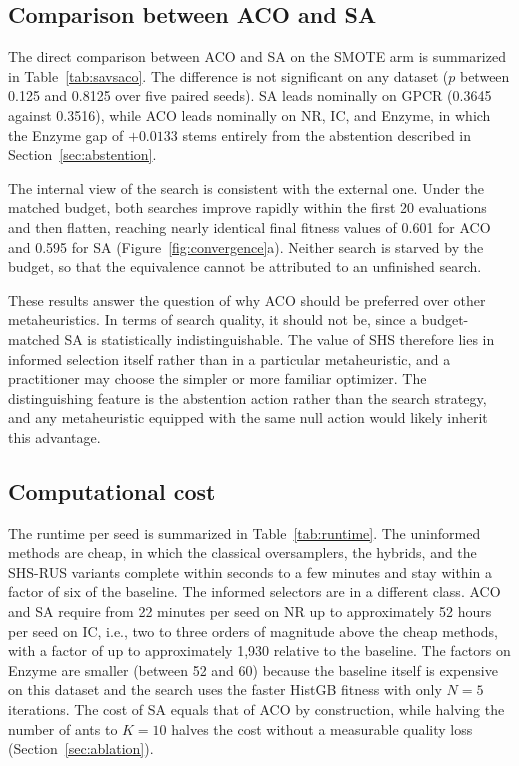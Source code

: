 \documentclass[10pt,a4paper]{article}
\begin{document}
\subsection{Comparison between ACO and SA}
The direct comparison between ACO and SA on the SMOTE arm is summarized
in Table~\ref{tab:savsaco}. The difference is not significant on any
dataset ($p$ between 0.125 and 0.8125 over five paired seeds). SA leads
nominally on GPCR (0.3645 against 0.3516), while ACO leads nominally on
NR, IC, and Enzyme, in which the Enzyme gap of $+0.0133$ stems entirely
from the abstention described in Section~\ref{sec:abstention}.

The internal view of the search is consistent with the external one.
Under the matched budget, both searches improve rapidly within the first
20 evaluations and then flatten, reaching nearly identical final fitness
values of 0.601 for ACO and 0.595 for SA
(Figure~\ref{fig:convergence}a). Neither search is starved by the
budget, so that the equivalence cannot be attributed to an unfinished
search.

These results answer the question of why ACO should be preferred over
other metaheuristics. In terms of search quality, it should not be,
since a budget-matched SA \citep{kirkpatrick1983optimization,
chennuru2022simulated} is statistically indistinguishable. The value of
SHS therefore lies in informed selection itself rather than in a
particular metaheuristic, and a practitioner may choose the simpler or
more familiar optimizer. The distinguishing feature is the abstention
action rather than the search strategy, and any metaheuristic equipped
with the same null action would likely inherit this advantage.

\begin{table}[htbp]
\centering
\caption{The budget-matched comparison between SHS-ACO (SMOTE) and
SHS-SA (SMOTE) on the four datasets.}
\label{tab:savsaco}
\end{table}

\subsection{Computational cost}
The runtime per seed is summarized in Table~\ref{tab:runtime}. The
uninformed methods are cheap, in which the classical oversamplers, the
hybrids, and the SHS-RUS variants complete within seconds to a few
minutes and stay within a factor of six of the baseline. The informed
selectors are in a different class. ACO and SA require from 22 minutes
per seed on NR up to approximately 52 hours per seed on IC, i.e., two to
three orders of magnitude above the cheap methods, with a factor of up to approximately 1,930 relative to the baseline. The factors on Enzyme are smaller
(between 52 and 60) because the baseline itself is expensive on this
dataset and the search uses the faster HistGB fitness with only $N = 5$ iterations. The cost of SA
equals that of ACO by construction, while halving the number of ants to
$K = 10$ halves the cost without a measurable quality loss
(Section~\ref{sec:ablation}).
\end{document}
